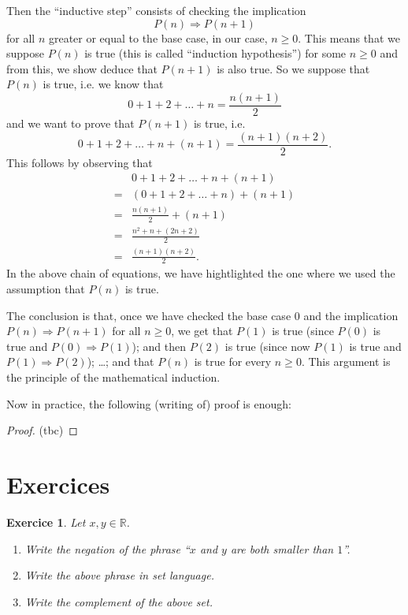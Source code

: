 \documentclass[
	fontsize=10pt, %
	twoside=true, %
	secnumdepth=1, %
	numbers=noenddot, %
]{kaobook}
\newtheorem{exer}{Exercice}[chapter]
\begin{document}
Then the ``inductive step'' consists of checking the implication
\begin{equation*}
P(n)\Rightarrow P(n+1)
\end{equation*}
for all $n$ greater or equal to the base case, in our case, $n\geq 0$. This means that we suppose $P(n)$ is true (this is called ``induction hypothesis'') for some $n\geq 0$ and from this, we show deduce that $P(n+1)$ is also true. So we suppose that $P(n)$ is true, i.e. we know that
\begin{equation*}
0+1+2+\dots+n=\frac{n(n+1)}{2}
\end{equation*}
and we want to prove that $P(n+1)$ is true, i.e.
\begin{equation*}
0+1+2+\dots+n+(n+1)=\frac{(n+1)(n+2)}{2}.
\end{equation*}
This follows by observing that
\begin{align*}
&0+1+2+\dots+n+(n+1)\\
=&{}(0+1+2+\dots+n)+(n+1)\\
=&{}\frac{n(n+1)}{2}+(n+1)\tag*{(induction hypothesis)}\\
=&{}\frac{n^2+n+(2n+2)}{2}\\
=&{}\frac{(n+1)(n+2)}{2}.
\end{align*}
In the above chain of equations, we have hightlighted the one where we used the assumption that $P(n)$ is true.

The conclusion is that, once we have checked the base case $0$ and the implication $P(n)\Rightarrow P(n+1)$ for all $n\geq 0$, we get that $P(1)$ is true (since $P(0)$ is true and $P(0)\Rightarrow P(1)$); and then $P(2)$ is true (since now $P(1)$ is true and $P(1)\Rightarrow P(2)$); \dots; and that $P(n)$ is true for every $n\geq 0$. This argument is the principle of the mathematical induction.

Now in practice, the following (writing of) proof is enough:
\begin{proof}
(tbc)
\end{proof}

\section{Exercices}
\begin{exer}
Let $x,y\in\mathbb{R}$.
\begin{enumerate}
	\item Write the negation of the phrase ``$x$ and $y$ are both smaller than $1$''.
	\item Write the above phrase in set language.
	\item Write the complement of the above set.
\end{enumerate}
\end{exer}
\end{document}
